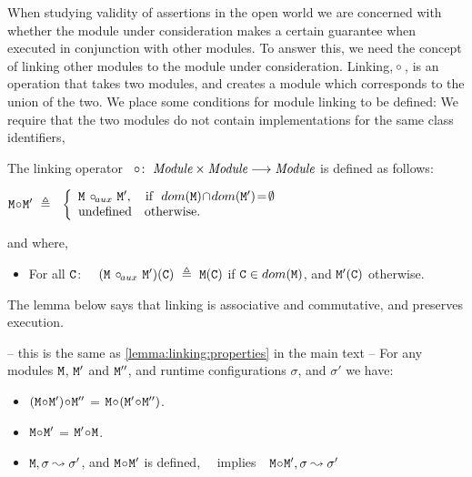 When studying validity of assertions in the open world we are concerned with whether   the  module
under consideration makes  a certain guarantee when executed in conjunction with other modules. To answer this, we
 need the concept of linking other modules to the module  under consideration.
 Linking, $\!\circ\!$ ,  is an operation that takes two modules, and creates a module which corresponds  to the union of the two.
We place some conditions for module linking to be defined: We require that the two modules do not contain implementations for the same class identifiers,



\begin{definition}
\label{def:link}
The linking operator\  \ $\!\circ\!:\  {\mbox{\tt{{\it Module}}}} \times  {\mbox{\tt{{\it Module}}}} \longrightarrow {\mbox{\tt{{\it Module}}}}$ is defined as follows:

$
\M \link \M{'}  \ \triangleq  \ \ \left\{
\begin{array}{l}
                        \M\ \link\!_{aux}\ \M{'},\ \ \   \hbox{if}\  \ dom(\M)\!\cap\!dom(\M')\!=\!\emptyset\\
\mbox{undefined}  \ \ \ \mbox{otherwise.}
\end{array}
                    \right.$

and where,
\begin{itemize}
     \item
   For all  ${\mbox{\tt{C}}}$: \ \
   $(\M\ \link\!_{aux}\ \M')(\prg{C})\  \triangleq  \ \M(\prg{C})$  if  ${\mbox{\tt{C}}}\in dom({\mbox{\tt{\ensuremath{{\mbox{\tt{M}}}}}}})$, and  ${\mbox{\tt{\ensuremath{{\mbox{\tt{M}}}}}}}'({\mbox{\tt{C}}})$ otherwise.
 \end{itemize}
\end{definition}

The lemma below says  that linking is associative and commutative, and preserves execution.

\begin{lemma} -- this is the same as \ref{lemma:linking:properties} in the main text --
 For any modules ${\mbox{\tt{\ensuremath{{\mbox{\tt{M}}}}}}}$,   ${\mbox{\tt{\ensuremath{{\mbox{\tt{M}}}}}}}'$ and ${\mbox{\tt{\ensuremath{{\mbox{\tt{M}}}}}}}''$, and runtime configurations $\sigma$, and $\sigma'$ we have$:$
 \label{lemma:linking:properties}

 \begin{itemize}
     \item
     $({\mbox{\tt{\ensuremath{{\mbox{\tt{M}}}}}}} \!\circ\! {\mbox{\tt{\ensuremath{{\mbox{\tt{M}}}}}}}')\!\circ\! {\mbox{\tt{\ensuremath{{\mbox{\tt{M}}}}}}}''$ = ${\mbox{\tt{\ensuremath{{\mbox{\tt{M}}}}}}} \!\circ\! ({\mbox{\tt{\ensuremath{{\mbox{\tt{M}}}}}}}' \!\circ\! {\mbox{\tt{\ensuremath{{\mbox{\tt{M}}}}}}}'')$.
    \item
      ${\mbox{\tt{\ensuremath{{\mbox{\tt{M}}}}}}} \!\circ\! {\mbox{\tt{\ensuremath{{\mbox{\tt{M}}}}}}}'$  = ${\mbox{\tt{\ensuremath{{\mbox{\tt{M}}}}}}}' \!\circ\!{\mbox{\tt{\ensuremath{{\mbox{\tt{M}}}}}}}$.
      \item
      ${\mbox{\tt{\ensuremath{{\mbox{\tt{M}}}}}}}, \sigma \leadsto \sigma'$, and ${\mbox{\tt{\ensuremath{{\mbox{\tt{M}}}}}}}\!\circ\! {\mbox{\tt{\ensuremath{{\mbox{\tt{M}}}}}}}'$ is defined, \  \  implies\ \   ${\mbox{\tt{\ensuremath{{\mbox{\tt{M}}}}}}}\!\circ\! {\mbox{\tt{\ensuremath{{\mbox{\tt{M}}}}}}}', \sigma \leadsto \sigma'$
   \end{itemize}

 \end{lemma}

